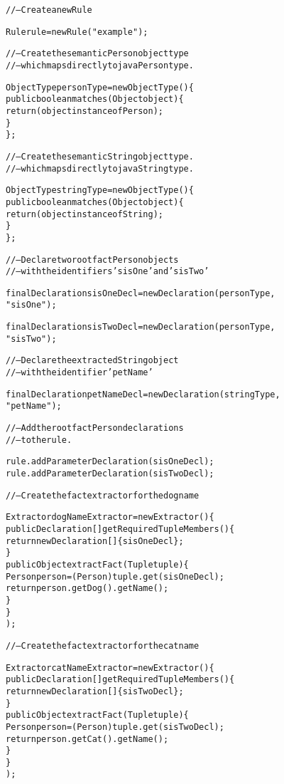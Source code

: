 \footnotesize
\begin{alltt}
// -- Create a new Rule

Rule rule = new Rule("example");

// -- Create the semantic Person object type
// -- which maps directly to java Person type.

ObjectType personType = new ObjectType() \{
        public boolean matches(Object object) \{ 
            return ( object instanceof Person );
        \}
    \};

// -- Create the semantic String object type.
// -- which maps directly to java String type.

ObjectType stringType = new ObjectType() \{
        public boolean matches(Object object) \{ 
            return ( object instanceof String );
        \}
    \};

// -- Declare two root fact Person objects 
// -- with the identifiers 'sisOne' and 'sisTwo'

final Declaration sisOneDecl = new Declaration( personType,
                                                "sisOne" );

final Declaration sisTwoDecl = new Declaration( personType,
                                                "sisTwo" );

// -- Declare the extracted String object
// -- with the identifier 'petName'

final Declaration petNameDecl = new Declaration( stringType,
                                                 "petName" );

// -- Add the root fact Person declarations
// -- to the rule.

rule.addParameterDeclaration( sisOneDecl );
rule.addParameterDeclaration( sisTwoDecl );

\newpage

// -- Create the fact extractor for the dog name

Extractor dogNameExtractor = new Extractor() \{
        public Declaration[] getRequiredTupleMembers() \{
            return new Declaration[] \{ sisOneDecl \};
        \}
        public Object extractFact(Tuple tuple) \{
            Person person = (Person) tuple.get( sisOneDecl );
            return person.getDog().getName();
        \}
    \}
      );

// -- Create the fact extractor for the cat name

Extractor catNameExtractor = new Extractor() \{
        public Declaration[] getRequiredTupleMembers() \{
            return new Declaration[] \{ sisTwoDecl \};
        \}
        public Object extractFact(Tuple tuple) \{
            Person person = (Person) tuple.get( sisTwoDecl );
            return person.getCat().getName();
        \}
    \}
      );


\end{alltt}
